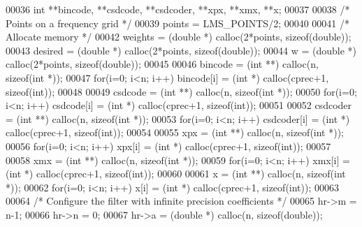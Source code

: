 \begin{DoxyCode}
00036   \textcolor{keywordtype}{int} **bincode, **csdcode, **csdcoder, **xpx, **xmx, **x;
00037 
00038   \textcolor{comment}{/* Points on a frequency grid */}
00039   points = LMS_POINTS/2;
00040 
00041   \textcolor{comment}{/* Allocate memory */}
00042   weights = (\textcolor{keywordtype}{double} *) calloc(2*points, \textcolor{keyword}{sizeof}(\textcolor{keywordtype}{double}));
00043   desired = (\textcolor{keywordtype}{double} *) calloc(2*points, \textcolor{keyword}{sizeof}(\textcolor{keywordtype}{double}));
00044   w = (\textcolor{keywordtype}{double} *) calloc(2*points, \textcolor{keyword}{sizeof}(\textcolor{keywordtype}{double}));
00045 
00046   bincode = (\textcolor{keywordtype}{int} **) calloc(n, \textcolor{keyword}{sizeof}(\textcolor{keywordtype}{int} *));
00047   \textcolor{keywordflow}{for}(i=0; i<n; i++) bincode[i] = (\textcolor{keywordtype}{int} *) calloc(cprec+1, \textcolor{keyword}{sizeof}(\textcolor{keywordtype}{int}));
00048 
00049   csdcode = (\textcolor{keywordtype}{int} **) calloc(n, \textcolor{keyword}{sizeof}(\textcolor{keywordtype}{int} *));
00050   \textcolor{keywordflow}{for}(i=0; i<n; i++) csdcode[i] = (\textcolor{keywordtype}{int} *) calloc(cprec+1, \textcolor{keyword}{sizeof}(\textcolor{keywordtype}{int}));
00051 
00052   csdcoder = (\textcolor{keywordtype}{int} **) calloc(n, \textcolor{keyword}{sizeof}(\textcolor{keywordtype}{int} *));
00053   \textcolor{keywordflow}{for}(i=0; i<n; i++) csdcoder[i] = (\textcolor{keywordtype}{int} *) calloc(cprec+1, \textcolor{keyword}{sizeof}(\textcolor{keywordtype}{int}));
00054 
00055   xpx = (\textcolor{keywordtype}{int} **) calloc(n, \textcolor{keyword}{sizeof}(\textcolor{keywordtype}{int} *));
00056   \textcolor{keywordflow}{for}(i=0; i<n; i++) xpx[i] = (\textcolor{keywordtype}{int} *) calloc(cprec+1, \textcolor{keyword}{sizeof}(\textcolor{keywordtype}{int}));
00057 
00058   xmx = (\textcolor{keywordtype}{int} **) calloc(n, \textcolor{keyword}{sizeof}(\textcolor{keywordtype}{int} *));
00059   \textcolor{keywordflow}{for}(i=0; i<n; i++) xmx[i] = (\textcolor{keywordtype}{int} *) calloc(cprec+1, \textcolor{keyword}{sizeof}(\textcolor{keywordtype}{int}));
00060 
00061   x = (\textcolor{keywordtype}{int} **) calloc(n, \textcolor{keyword}{sizeof}(\textcolor{keywordtype}{int} *));
00062   \textcolor{keywordflow}{for}(i=0; i<n; i++) x[i] = (\textcolor{keywordtype}{int} *) calloc(cprec+1, \textcolor{keyword}{sizeof}(\textcolor{keywordtype}{int}));
00063 
00064   \textcolor{comment}{/* Configure the filter with infinite precision coefficients */}
00065   hr->m = n-1;
00066   hr->n = 0;
00067   hr->a = (\textcolor{keywordtype}{double} *) calloc(n, \textcolor{keyword}{sizeof}(\textcolor{keywordtype}{double}));

\end{DoxyCode}

